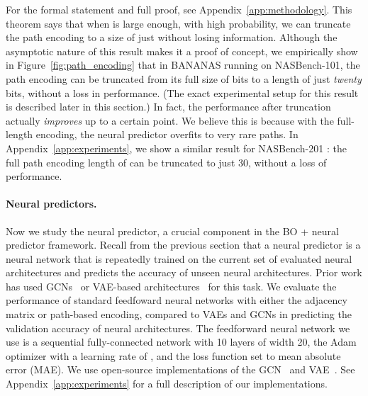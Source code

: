 \documentclass[11pt]{article}
\numberwithin{equation}{section}
\numberwithin{figure}{section}
\theoremstyle{plain}
\theoremstyle{definition}
\begin{document}
For the formal statement and full proof, see 
Appendix~\ref{app:methodology}.
This theorem says that when  is large enough, with high probability, 
we can truncate the path encoding to a size of just  without losing information.
Although the asymptotic nature of this result makes it a proof of concept, 
we empirically show in Figure~\ref{fig:path_encoding} that in BANANAS running on
NASBench-101,
the path encoding can be truncated from its full size of 
 bits to a length of just \emph{twenty} bits,
without a loss in performance. (The exact experimental setup for this result is 
described later in this section.)
In fact, the performance after truncation actually \emph{improves} up to a certain
point. We believe this is because with the full-length encoding, 
the neural predictor overfits to very rare paths.
In Appendix~\ref{app:experiments},
we show a similar result for NASBench-201 \cite{nasbench201}:
the full path encoding length of  can be truncated to just 30, 
without a loss of performance.

\begin{comment}
\begin{figure}
\centering
    \texttt{[image: fig/path\_length.pdf]}
    \caption{Performance of BANANAS with the path encoding truncated to different
    lengths. Since each node has 3 choices of operations, the ``natural''
    cutoffs are at powers of 3.
    }
    \label{fig:path_length}
\end{figure}
\end{comment}




\paragraph{Neural predictors.}
Now we study the neural predictor, a crucial component in the BO + neural predictor
framework. 
Recall from the previous section that a neural predictor is a neural network 
that is repeatedly trained on the current set of evaluated 
neural architectures and predicts the
accuracy of unseen neural architectures. 
Prior work has used GCNs~\cite{shi2019multi, ma2019deep}
or VAE-based architectures~\cite{dvae} for this task.
We evaluate the performance of standard feedfoward
neural networks with either the adjacency matrix or path-based encoding,
compared to VAEs and GCNs in predicting the validation accuracy 
of neural architectures.
The feedforward neural network we use is a sequential fully-connected
network with 10 layers of width 20, 
the Adam optimizer with a learning rate of , 
and the loss function set to mean absolute error (MAE).
We use open-source implementations of the GCN~\cite{zhang2020neural}
and VAE~\cite{dvae}. 
See Appendix~\ref{app:experiments}
for a full 
description of our implementations.
\end{document}
